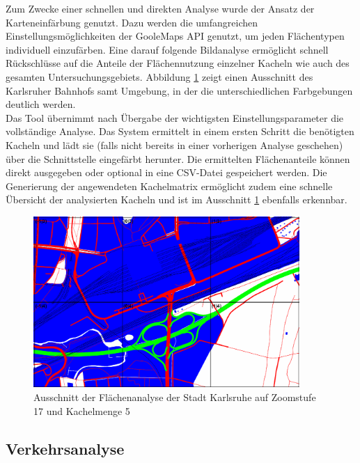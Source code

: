 Zum Zwecke einer schnellen und direkten Analyse wurde der Ansatz der Karteneinfärbung genutzt. Dazu werden die umfangreichen Einstellungsmöglichkeiten der GooleMaps API genutzt, um jeden Flächentypen individuell einzufärben. Eine darauf folgende Bildanalyse ermöglicht schnell Rückschlüsse auf die Anteile der Flächennutzung einzelner Kacheln wie auch des gesamten Untersuchungsgebiets. Abbildung \ref{fig:ka_area_analysis} zeigt einen Ausschnitt des Karlsruher Bahnhofs samt Umgebung, in der die unterschiedlichen Farbgebungen deutlich werden.\\

Das Tool übernimmt nach Übergabe der wichtigsten Einstellungsparameter die vollständige Analyse. Das System ermittelt in einem ersten Schritt die benötigten Kacheln und lädt sie (falls nicht bereits in einer vorherigen Analyse geschehen) über die Schnittstelle eingefärbt herunter. Die ermittelten Flächenanteile können direkt ausgegeben oder optional in eine CSV-Datei gespeichert werden. Die Generierung der angewendeten Kachelmatrix ermöglicht zudem eine schnelle Übersicht der analysierten Kacheln und ist im Ausschnitt \ref{fig:ka_area_analysis} ebenfalls erkennbar.

\begin{figure}
  \centering
    \includegraphics[width=0.9\textwidth]{images/karlsruhe_area_analysis_ausschnitt.png}
    \caption{Ausschnitt der Flächenanalyse der Stadt Karlsruhe auf Zoomstufe 17 und Kachelmenge 5}
    \label{fig:ka_area_analysis}
\end{figure}

\subsection{Verkehrsanalyse}
\label{sec:traffic-analysis}


